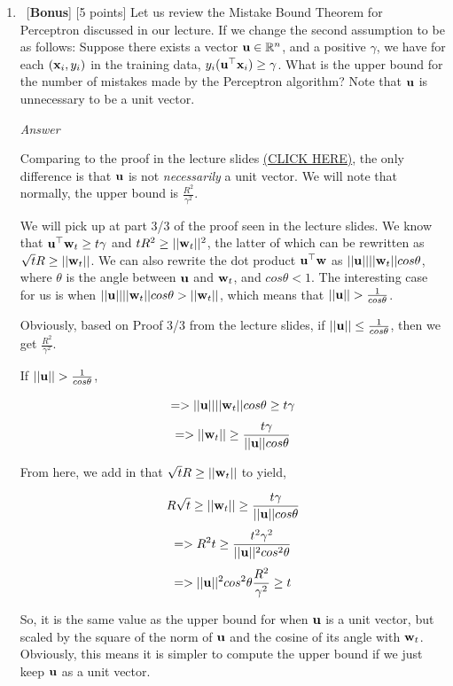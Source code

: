 \documentclass[12pt, fullpage,letterpaper]{article}
\begin{document}
\begin{enumerate}
\begin{enumerate}
		\end{enumerate}
	
	\item ~[\textbf{Bonus}] [5 points] Let us review the Mistake Bound Theorem for Perceptron discussed in our lecture.  If we change the second assumption to be as follows: Suppose there exists a vector ${\bf u}\in \mathbb{R}^n$, and a positive $\gamma$, we have for each $({\bf x}_i, y_i)$ in the training data, $y_i({\bf u}^\top {\bf x}_i) \ge \gamma$. What is the upper bound for the number of mistakes made by the Perceptron algorithm?   Note that ${\bf u}$ is unnecessary to be a unit vector.
	
	\emph{Answer}
	
	Comparing to the proof in the lecture slides \href{https://www.cs.utah.edu/~zhe/teach/pdf/Perceptron.pdf}{(CLICK HERE)}, the only difference is that ${\bf u}$ is not \emph{necessarily} a unit vector. We will note that normally, the upper bound is $\frac{R^2}{\gamma^2}$.
	
	We will pick up at part 3/3 of the proof seen in the lecture slides. We know that ${\bf u}^\top {\bf w}_t \geq t \gamma$ and $t R^2 \geq ||{\bf w}_t||^2$, the latter of which can be rewritten as $\sqrt{t} R \geq ||{\bf w}_t||$. We can also rewrite the dot product ${\bf u}^\top {\bf w}$ as $||{\bf u}|| ||{\bf w}_t|| cos\theta$, where $\theta$ is the angle between ${\bf u}$ and ${\bf w}_t$, and $cos\theta < 1$. The interesting case for us is when $||{\bf u}|| ||{\bf w}_t|| cos\theta > ||{\bf w}_t||$, which means that $||{\bf u}|| > \frac{1}{cos\theta}$. 
	
	Obviously, based on Proof 3/3 from the lecture slides, if $||{\bf u}|| \leq \frac{1}{cos\theta}$, then we get $\frac{R^2}{\gamma^2}$.
	
	If $||{\bf u}|| > \frac{1}{cos\theta}$,
	
	\[
	    => ||{\bf u}|| ||{\bf w}_t|| cos\theta \geq t\gamma
	\]
	\[
	    => ||{\bf w}_t|| \geq \frac{t\gamma}{||{\bf u}|| cos\theta}
	\]
	
	From here, we add in that $\sqrt{t} R \geq ||{\bf w}_t||$ to yield,
	
	\[
	    R \sqrt{t} \geq ||{\bf w}_t|| \geq \frac{t\gamma}{||{\bf u}|| cos\theta}
	\]
	\[
	    => R^2 t \geq \frac{t^2 \gamma^2}{||{\bf u}||^2 cos^2\theta}
	\]
	\[
	    => ||{\bf u}||^2 cos^2\theta \frac{R^2}{\gamma^2} \geq t
	\]
	
	So, it is the same value as the upper bound for when ${\bf u}$ is a unit vector, but scaled by the square of the norm of ${\bf u}$ and the cosine of its angle with ${\bf w}_t$. Obviously, this means it is simpler to compute the upper bound if we just keep ${\bf u}$ as a unit vector.
	

\end{enumerate}
\end{document}
